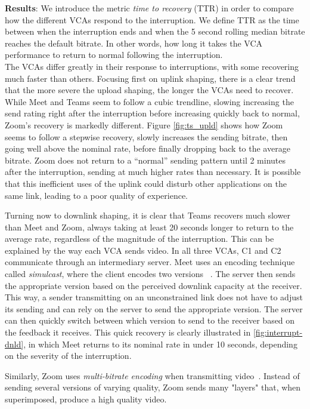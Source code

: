  

\noindent \textbf{Results}: 
We introduce the metric \textit{time to recovery} (TTR) in order to compare how the different VCAs respond to the interruption. We define TTR as the time 
between when the interruption ends and when the 5 second rolling median bitrate reaches the default bitrate. In other words, how long it takes the VCA performance to return to normal following the interruption.\\

The VCAs differ greatly in their response to interruptions, with some recovering much faster than others. Focusing first on uplink shaping, there is a clear trend that the more severe the upload shaping, the longer the VCAs need to recover. While Meet and Teams seem to follow a cubic trendline, slowing increasing the send rating right after the interruption before increasing quickly back to normal, Zoom's recovery is markedly different. Figure \ref{fig:ts_upld} shows how Zoom seems to follow a stepwise recovery, slowly increases the sending bitrate, then going well above the nominal rate, before finally dropping back to the average bitrate. Zoom does not return to a ``normal'' sending pattern until 2 minutes after the interruption, sending at much higher rates than necessary. It is possible that this inefficient uses of the uplink could disturb other applications on the same link, leading to a poor quality of experience. 

Turning now to downlink shaping, it is clear that Teams recovers much slower than Meet and Zoom, always taking at least 20 seconds longer to return to the average rate, regardless of the magnitude of the interruption. This can be explained by the way each VCA sends video. In all three VCAs, C1 and C2 communicate through an intermediary server. Meet uses an encoding technique called \textit{simulcast}, where the client encodes two versions ~\cite{nistico2020comparative}. The server then sends the appropriate version based on the perceived downlink capacity at the receiver. This way, a sender transmitting on an unconstrained link does not have to adjust its sending and can rely on the server to send the appropriate version. The server can then quickly switch between which version to send to the receiver based on the feedback it receives. This quick recovery is clearly illustrated in \ref{fig:interrupt-dnld}, in which Meet returns to its nominal rate in under 10 seconds, depending on the severity of the interruption.

Similarly, Zoom uses \textit{multi-bitrate encoding} when transmitting video~\cite{zoom_encoding}. Instead of sending several versions of varying quality, Zoom sends many "layers" that, when superimposed, produce a high quality video. 


